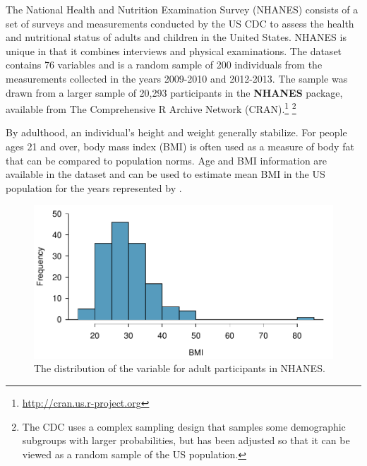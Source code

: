 \begin{spacing}{1.5}
The National Health and Nutrition Examination Survey (NHANES) consists of a set of surveys and measurements conducted by the US CDC to assess the health and nutritional status of adults and children in the United States. NHANES is unique in that it combines interviews and physical examinations.  The dataset  contains 76 variables and is a random sample of 200 individuals from the measurements collected in the years 2009-2010 and 2012-2013. The sample was drawn from a larger sample of 20,293 participants in the \textbf{NHANES} package, available from The Comprehensive R Archive Network (CRAN).\footnote{\url{http://cran.us.r-project.org}} \footnote{The CDC uses a complex sampling design that samples some demographic subgroups with larger probabilities, but  has been adjusted so that it can be viewed as a random sample of the US population.}  

By adulthood, an individual's height and weight generally stabilize. For people ages 21 and over, body mass index (BMI) is often used as a measure of body fat that can be compared to population norms. Age and BMI information are available in the dataset and can be used to estimate mean BMI in the US population for the years represented by .

\begin{figure}[h]
	\centering
	\includegraphics[width=\textwidth]
	{ch_inference_foundations_oi_biostat/figures/nhanesAdultBmiHist/nhanesAdultBmiHist}
	\caption{The distribution of the variable  for adult participants in NHANES.}
	\label{nhanesAdultBmiHist}
\end{figure}



\end{spacing}

